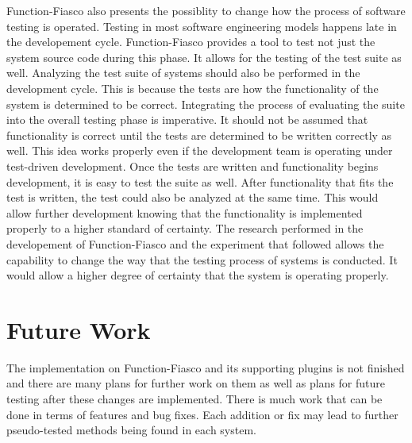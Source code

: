   Function-Fiasco also presents the possiblity to change how the process of software testing is operated. Testing in most software engineering models happens late in the developement cycle. Function-Fiasco provides a tool to test not just the system source code during this phase. It allows for the testing of the test suite as well. Analyzing the test suite of systems should also be performed in the development cycle. This is because the tests are how the functionality of the system is determined to be correct. Integrating the process of evaluating the suite into the overall testing phase is imperative. It should not be assumed that functionality is correct until the tests are determined to be written correctly as well. This idea works properly even if the development team is operating under test-driven development. Once the tests are written and functionality begins development, it is easy to test the suite as well. After functionality that fits the test is written, the test could also be analyzed at the same time. This would allow further development knowing that the functionality is implemented properly to a higher standard of certainty. The research performed in the developement of Function-Fiasco and the experiment that followed allows the capability to change the way that the testing process of systems is conducted. It would allow a higher degree of certainty that the system is operating properly.

\section{Future Work}
The implementation on Function-Fiasco and its supporting plugins is not finished and there are many plans for further work on them as well as plans for future testing after these changes are implemented. There is much work that can be done in terms of features and bug fixes. Each addition or fix may lead to further pseudo-tested methods being found in each system.

